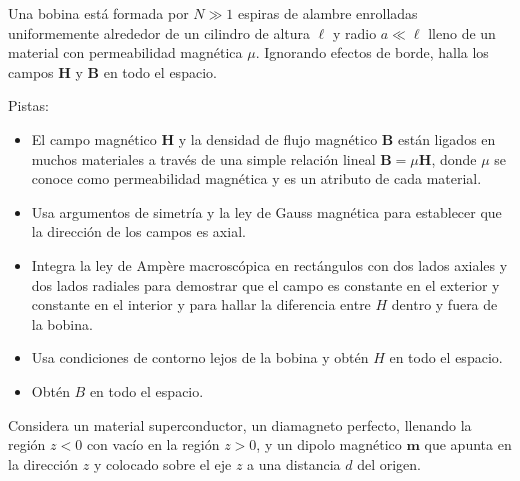 \documentclass{exam}
\begin{document}
\begin{questions}
\question Una bobina está formada por $N\gg 1$ espiras de alambre
  enrolladas uniformemente alrededor de un cilindro de altura $\ell$ y
  radio $a\ll \ell$ lleno de un material con permeabilidad magnética
  $\mu$. Ignorando efectos de borde, halla los campos $\bm H$ y $\bm
  B$ en todo el espacio.

  Pistas:
  \begin{itemize}
  \item El campo magnético $\bm H$ y la densidad de flujo magnético
    $\bm B$ están ligados en muchos materiales a través de una
    simple relación lineal $\bm B=\mu\bm H$, donde $\mu$ se conoce
    como permeabilidad magnética y es un atributo de cada material.
  \item Usa argumentos de simetría y la ley de Gauss magnética para
    establecer que la dirección de los campos es axial.
  \item Integra la ley de Ampère macroscópica en rectángulos con dos
    lados axiales y dos lados radiales para demostrar que el campo es
    constante en el exterior y constante en el interior y para hallar
    la diferencia entre $H$ dentro y fuera de la bobina.
  \item Usa condiciones de contorno lejos de la bobina y obtén $H$ en
    todo el espacio.
  \item Obtén $B$ en todo el espacio.
  \end{itemize}

\question Considera un material superconductor, un diamagneto
  perfecto, llenando la región $z<0$ con vacío en la región $z>0$, y
  un dipolo magnético $\bm m$ que apunta en la dirección $z$ y
  colocado sobre el eje $z$ a una distancia $d$ del origen.


\end{questions}
\end{document}
